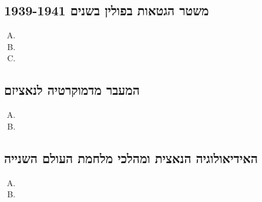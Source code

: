 \documentclass[a4paper]{article}
\begin{document}
	\subsection{משטר הגטאות בפולין בשנים 1939-1941}
		\begin{enumerate}[A.]
			\item 
			\item 
			\item 
		\end{enumerate}
	\subsection{המעבר מדמוקרטיה לנאציזם}
		\begin{enumerate}[A.]
			\item 
			\item 
		\end{enumerate}
	\subsection{האידיאולוגיה הנאצית ומהלכי מלחמת העולם השנייה}
		\begin{enumerate}[A.]
			\item 
			\item 
		\end{enumerate}
	
	
\end{document}
